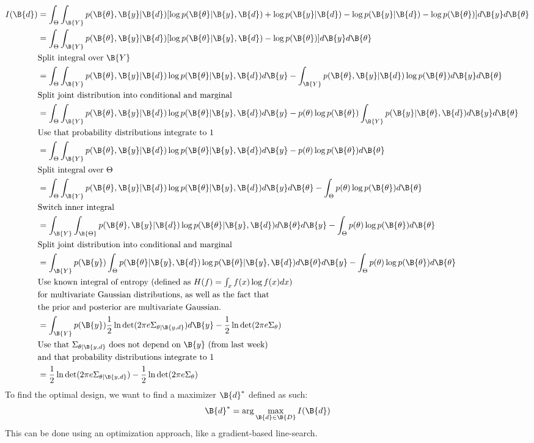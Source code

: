\begin{align*}
  I(\B{d}) &= \int_{\Theta}\int_{\B{Y}}p(\B{\theta}, \B{y}|\B{d})[\log p(\B{\theta}| \B{y}, \B{d}) + \log p(\B{y}|\B{d}) - \log p(\B{y}|\B{d}) - \log p(\B{\theta})]d\B{y}d\B{\theta}\\
 &= \int_{\Theta}\int_{\B{Y}}p(\B{\theta}, \B{y}|\B{d})[\log p(\B{\theta}| \B{y}, \B{d}) - \log p(\B{\theta})]d\B{y}d\B{\theta}\\
 & \mbox{Split integral over $\B{Y}$}\\
 &= \int_{\Theta}\int_{\B{Y}}p(\B{\theta}, \B{y}|\B{d})\log p(\B{\theta}| \B{y}, \B{d}) d\B{y}- \int_{\B{Y}}p(\B{\theta}, \B{y}|\B{d})\log p(\B{\theta})d\B{y}d\B{\theta}\\
 & \mbox{Split joint distribution into conditional and marginal} \\
&= \int_{\Theta}\int_{\B{Y}}p(\B{\theta}, \B{y}|\B{d})\log p(\B{\theta}| \B{y}, \B{d}) d\B{y}- p(\theta)\log p(\B{\theta})\int_{\B{Y}}p(\B{y}|\B{\theta}, \B{d})d\B{y}d\B{\theta}\\
 & \mbox{Use that probability distributions integrate to 1} \\
&= \int_{\Theta}\int_{\B{Y}}p(\B{\theta}, \B{y}|\B{d})\log p(\B{\theta}| \B{y}, \B{d}) d\B{y}- p(\theta)\log p(\B{\theta})d\B{\theta}\\
  & \mbox{Split integral over $\Theta$} \\
&= \int_{\Theta}\int_{\B{Y}}p(\B{\theta}, \B{y}|\B{d})\log p(\B{\theta}| \B{y}, \B{d}) d\B{y}d\B{\theta}- \int_\Theta p(\theta)\log p(\B{\theta})d\B{\theta}\\
  & \mbox{Switch inner integral} \\
&= \int_{\B{Y}}\int_{\B{\Theta}}p(\B{\theta}, \B{y}|\B{d})\log p(\B{\theta}| \B{y}, \B{d}) d\B{\theta}d\B{y}- \int_\Theta p(\theta)\log p(\B{\theta})d\B{\theta}\\
 & \mbox{Split joint distribution into conditional and marginal} \\
&= \int_{\B{Y}}p(\B{y})\int_{\Theta}p(\B{\theta}|\B{y},\B{d})\log p(\B{\theta}| \B{y}, \B{d}) d\B{\theta}d\B{y}- \int_\Theta p(\theta)\log p(\B{\theta})d\B{\theta}\\
& \mbox{Use known integral of entropy (defined as $H(f) = \int_x f(x)\log f(x) dx$) }\\
& \mbox{for multivariate Gaussian distributions, as well as the fact that }\\
& \mbox{the prior and posterior are multivariate Gaussian.} \\
&= \int_{\B{Y}}p(\B{y})\frac{1}{2}\ln \det (2\pi e \Sigma_{\theta|\B{y,d}})d\B{y}- \frac{1}{2}\ln \det (2\pi e\Sigma_\theta)\\
& \mbox{Use that $\Sigma_{\theta | \B{y, d}}$ does not depend on $\B{y}$ (from last week)} \\
& \mbox{and that probability distributions integrate to 1} \\
&= \frac{1}{2}\ln \det (2\pi e \Sigma_{\theta|\B{y,d}})- \frac{1}{2}\ln \det (2\pi e\Sigma_\theta)\\
\end{align*}
To find the optimal design, we want to find a maximizer $\B{d}^*$ defined as such:
$$\B{d}^* = \arg \max_{\B{d}\in \B{D}} I(\B{d})$$
This can be done using an optimization approach, like a gradient-based line-search.

